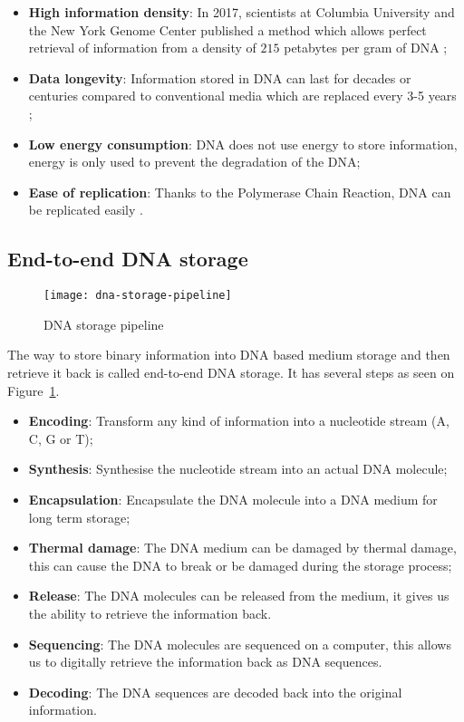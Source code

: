 \begin{itemize}
    \item \textbf{High information density}:
In 2017, scientists at Columbia University and the New York Genome Center published a method which allows perfect retrieval of information from a density of $215$ petabytes per gram of DNA \cite{bib:erlich_yaniv_2017_889697};
    \item \textbf{Data longevity}: Information stored in DNA can last for decades or centuries compared to conventional media which are replaced every 3-5 years \cite{bib:33649304};
    \item \textbf{Low energy consumption}: DNA does not use energy to store information, energy is only used to prevent the degradation of the DNA;
    \item \textbf{Ease of replication}: Thanks to the Polymerase Chain Reaction, DNA can be replicated easily \cite{bib:Mullis_1990}.
\end{itemize}

\subsection{End-to-end DNA storage}

\begin{figure}
    \centering
    \texttt{[image: dna-storage-pipeline]}
    \caption{DNA storage pipeline}
    \label{fig:dna-storage-pipeline}
\end{figure}


The way to store binary information into DNA based medium storage and then retrieve it back is called end-to-end DNA storage. It has several steps as seen on Figure~\ref{fig:dna-storage-pipeline}.

\begin{itemize}
    \item \textbf{Encoding}: Transform any kind of information into a nucleotide stream (A, C, G or T);
    \item \textbf{Synthesis}: Synthesise the nucleotide stream into an actual DNA molecule;
    \item \textbf{Encapsulation}: Encapsulate the DNA molecule into a DNA medium for long term storage;
    \item \textbf{Thermal damage}: The DNA medium can be damaged by thermal damage, this can cause the DNA to break or be damaged during the storage process;
    \item \textbf{Release}: The DNA molecules can be released from the medium, it gives us the ability to retrieve the information back.
    \item \textbf{Sequencing}: The DNA molecules are sequenced on a computer, this allows us to digitally retrieve the information back as DNA sequences.
    \item \textbf{Decoding}: The DNA sequences are decoded back into the original information.
\end{itemize}

